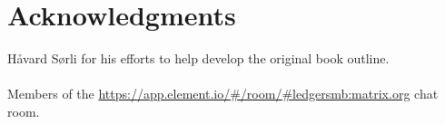 \section*{Acknowledgments}
\label{sec-acknowledgements}

H{\aa}vard S{\o}rli for his efforts to help develop the original book outline.\\
~ \\
Members of the \url{https://app.element.io/#/room/#ledgersmb:matrix.org}  chat room.










\clearpage
{}
\printglossary[type=acronym]

\clearpage
{}
\printglossary[title={Definition of terms}]

\clearpage
{}
\printindex



